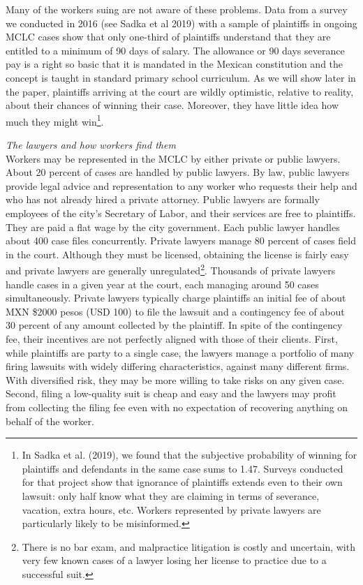 \documentclass[oneside,12pt]{article}
\begin{document}
Many of the workers suing are not aware of these problems. Data from a survey we conducted in 2016 (see Sadka et al 2019) with a sample of plaintiffs in ongoing MCLC cases show that only one-third of plaintiffs understand that they are entitled to a minimum of 90 days of salary. The allowance or 90 days severance pay is a right so basic that it is mandated in the Mexican constitution and the concept is taught in standard primary school curriculum. As we will show later in the paper, plaintiffs arriving at the court are wildly optimistic, relative to reality, about their chances of winning their case. Moreover, they have little idea how much they might win\footnote{In Sadka et al. (2019), we found that the subjective probability of winning for plaintiffs and defendants in the same case sums to 1.47. Surveys conducted for that project show that ignorance of plaintiffs extends even to their own lawsuit: only half know what they are claiming in terms of severance, vacation, extra hours, etc. Workers represented by private lawyers are particularly likely to be misinformed.}.

\emph{The lawyers and how workers find them}\\
Workers may be represented in the MCLC by either private or public lawyers. About 20 percent of cases are handled by public lawyers. By law, public lawyers provide legal advice and representation to any worker who requests their help and who has not already hired a private attorney. Public lawyers are formally employees of the city’s Secretary of Labor, and their services are free to plaintiffs. They are paid a flat wage by the city government. Each public lawyer handles about 400 case files concurrently. Private lawyers manage 80 percent of cases field in the court. Although they must be licensed, obtaining the license is fairly easy and private lawyers are generally unregulated\footnote{There is no bar exam, and malpractice litigation is costly and uncertain, with very few known cases of a lawyer losing her license to practice due to a successful suit.}.  Thousands of private lawyers handle cases in a given year at the court, each managing around 50 cases simultaneously. Private lawyers typically charge plaintiffs an initial fee of about MXN \$2000 pesos (USD 100) to file the lawsuit and a contingency fee of about 30 percent of any amount collected by the plaintiff. In spite of the contingency fee, their incentives are not perfectly aligned with those of their clients. First, while plaintiffs are party to a single case, the lawyers manage a portfolio of many firing lawsuits with widely differing characteristics, against many different firms. With diversified risk, they may be more willing to take risks on any given case. Second, filing a low-quality suit is cheap and easy and the lawyers may profit from collecting the filing fee even with no expectation of recovering anything on behalf of the worker. 
\end{document}
